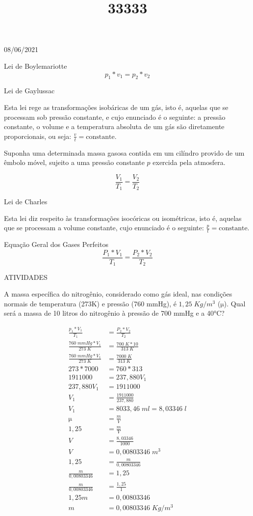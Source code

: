 \documentclass{SchoolBook}
\begin{document}
    \begin{day}{08/06/2021}
        \title{3}{Lei de Boylemariotte}
        $$ p_1 * v_1 = p_2 * v_2 $$
    
        \title{3}{Lei de Gaylussac}
        
        Esta lei rege as transformações isobáricas de um gás, isto é, aquelas que se processam sob pressão constante, e cujo enunciado é o seguinte: a pressão constante, o volume e a temperatura absoluta de um gás são diretamente proporcionais, ou seja: $ \frac{v}{t} = \text{constante} $.
        
        Suponha uma determinada massa gasosa contida em um cilíndro provido de um êmbolo móvel, sujeito a uma pressão constante $p$ exercida pela atmosfera.
        
        $$ \frac{V_1}{T_1} = \frac{V_2}{T_2} $$
        
        \title{3}{Lei de Charles}
        
        Esta lei diz respeito às transformações isocóricas ou isométricas, isto é, aquelas que se processam a volume constante, cujo enunciado é o seguinte: $\frac{p}{t} = \text{constante}$.
        
        \title{3}{Equação Geral dos Gases Perfeitos}
        $$ \frac{P_1 * V_1}{T_1} = \frac{P_2 * V_2}{T_2} $$
        
        \title{3}{ATIVIDADES}
        
        A massa específica do nitrogênio, considerado como gás ideal, nas condições normais de temperatura (273K) e pressão (760 mmHg), é $1,25\;Kg/m^3$ ($\si{\micro}$). Qual será a massa de 10 litros do nitrogênio à pressão de 700 mmHg e a 40°C?
        
        \begin{align*}
            \frac{p_1 * V_1}{T_1} &= \frac{P_2 * V_2}{T_2} \\
            \frac{760\;mmHg * V_1}{273\;K} &= \frac{700\;K * 10}{313\;K} \\
            \frac{760\;mmHg * V_1}{273\;K} &= \frac{7000\;K}{313\;K} \\
            273 * 7000 &= 760 * 313 \\
            1911000 &= 237,880 V_1 \\
            237,880 V_1 &= 1911000 \\
            V_1 &= \frac{1911000}{237,880} \\
            V_1 &= 8033,46\;ml = 8,03346\;l \\
            \si{\micro} &= \frac{m}{V} \\
            1,25 &= \frac{m}{V} \\
            V &= \frac{8,03346}{1000} \\
            V &= 0,00803346\;m^3 \\
            1,25 &= \frac{m}{0,00803346} \\
            \frac{m}{0,00803346} &= 1,25 \\
            \frac{m}{0,00803346} &= \frac{1,25}{1} \\
            1,25m &= 0,00803346 \\
            m &= 0,00803346\;Kg/m^3
        \end{align*}
        

\end{day}
\end{document}
